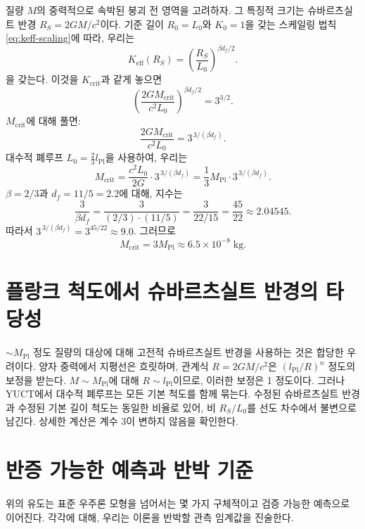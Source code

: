 \documentclass[11pt,a4paper]{article}
\newcommand{\Keff}{K_{\mathrm{eff}}}
\newcommand{\betaf}{\beta}
\newcommand{\Lpl}{l_{\mathrm{Pl}}}
\newcommand{\Lzero}{L_0}
\begin{document}
	질량 \(M\)의 중력적으로 속박된 붕괴 전 영역을 고려하자. 그 특징적 크기는 슈바르츠실트 반경 \(R_S = 2GM/c^2\)이다. 기준 길이 \(R_0 = \Lzero\)와 \(K_0 = 1\)을 갖는 스케일링 법칙 \eqref{eq:keff-scaling}에 따라, 우리는
	\[
	\Keff(R_S) = \left( \frac{R_S}{\Lzero} \right)^{\betaf d_f / 2}.
	\]
	을 갖는다. 이것을 \(K_{\mathrm{crit}}\)과 같게 놓으면
	\[
	\left( \frac{2GM_{\mathrm{crit}}}{c^2 \Lzero} \right)^{\betaf d_f / 2} = 3^{3/2}.
	\]
	\(M_{\mathrm{crit}}\)에 대해 풀면:
	\[
	\frac{2GM_{\mathrm{crit}}}{c^2 \Lzero} = 3^{\,3/(\betaf d_f)}.
	\]
	대수적 폐루프 \(\Lzero = \frac{2}{3} \Lpl\)을 사용하여, 우리는
	\[
	M_{\mathrm{crit}} = \frac{c^2 \Lzero}{2G} \cdot 3^{\,3/(\betaf d_f)} = \frac{1}{3} M_{\mathrm{Pl}} \cdot 3^{\,3/(\betaf d_f)}.
	\]
	\(\betaf = 2/3\)과 \(d_f = 11/5 = 2.2\)에 대해, 지수는
	\[
	\frac{3}{\betaf d_f} = \frac{3}{(2/3) \cdot (11/5)} = \frac{3}{22/15} = \frac{45}{22} \approx 2.04545.
	\]
	따라서 \(3^{\,3/(\betaf d_f)} = 3^{45/22} \approx 9.0\). 그러므로
	\[
	M_{\mathrm{crit}} = 3 M_{\mathrm{Pl}} \approx 6.5 \times 10^{-8}\;\text{kg}.
	\]
	
	\section{플랑크 척도에서 슈바르츠실트 반경의 타당성}
	
	\(\sim M_{\mathrm{Pl}}\) 정도 질량의 대상에 대해 고전적 슈바르츠실트 반경을 사용하는 것은 합당한 우려이다. 양자 중력에서 지평선은 흐릿하며, 관계식 \(R = 2GM/c^2\)은 \((\Lpl/R)^n\) 정도의 보정을 받는다. \(M \sim M_{\mathrm{Pl}}\)에 대해 \(R \sim \Lpl\)이므로, 이러한 보정은 1 정도이다. 그러나 YUCT에서 대수적 폐루프는 모든 기본 척도를 함께 묶는다. 수정된 슈바르츠실트 반경과 수정된 기본 길이 척도는 동일한 비율로 있어, 비 \(R_S / \Lzero\)를 선도 차수에서 불변으로 남긴다. 상세한 계산은 계수 3이 변하지 않음을 확인한다.
	
	\section{반증 가능한 예측과 반박 기준}
	
	위의 유도는 표준 우주론 모형을 넘어서는 몇 가지 구체적이고 검증 가능한 예측으로 이어진다. 각각에 대해, 우리는 이론을 반박할 관측 임계값을 진술한다.
	
\end{document}

